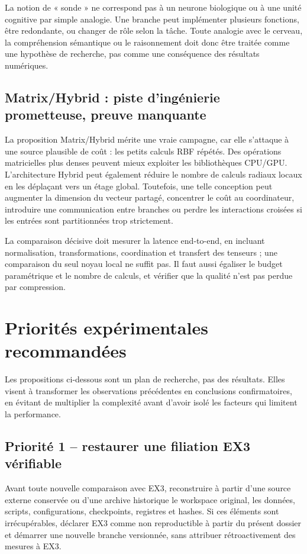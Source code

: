 \documentclass[11pt,a4paper]{article}
\begin{document}
La notion de « sonde » ne correspond pas à un neurone biologique ou à une unité cognitive par simple analogie. Une branche peut implémenter plusieurs fonctions, être redondante, ou changer de rôle selon la tâche. Toute analogie avec le cerveau, la compréhension sémantique ou le raisonnement doit donc être traitée comme une hypothèse de recherche, pas comme une conséquence des résultats numériques.

\subsection{Matrix/Hybrid : piste d'ingénierie prometteuse, preuve manquante}

La proposition Matrix/Hybrid mérite une vraie campagne, car elle s'attaque à une source plausible de coût : les petits calculs RBF répétés. Des opérations matricielles plus denses peuvent mieux exploiter les bibliothèques CPU/GPU. L'architecture Hybrid peut également réduire le nombre de calculs radiaux locaux en les déplaçant vers un étage global. Toutefois, une telle conception peut augmenter la dimension du vecteur partagé, concentrer le coût au coordinateur, introduire une communication entre branches ou perdre les interactions croisées si les entrées sont partitionnées trop strictement.

La comparaison décisive doit mesurer la latence end-to-end, en incluant normalisation, transformations, coordination et transfert des tenseurs ; une comparaison du seul noyau local ne suffit pas. Il faut aussi égaliser le budget paramétrique et le nombre de calculs, et vérifier que la qualité n'est pas perdue par compression.

\section{Priorités expérimentales recommandées}

Les propositions ci-dessous sont un plan de recherche, pas des résultats. Elles visent à transformer les observations précédentes en conclusions confirmatoires, en évitant de multiplier la complexité avant d'avoir isolé les facteurs qui limitent la performance.

\subsection{Priorité 1 -- restaurer une filiation EX3 vérifiable}

Avant toute nouvelle comparaison avec EX3, reconstruire à partir d'une source externe conservée ou d'une archive historique le workspace original, les données, scripts, configurations, checkpoints, registres et hashes. Si ces éléments sont irrécupérables, déclarer EX3 comme non reproductible à partir du présent dossier et démarrer une nouvelle branche versionnée, sans attribuer rétroactivement des mesures à EX3.
\end{document}
